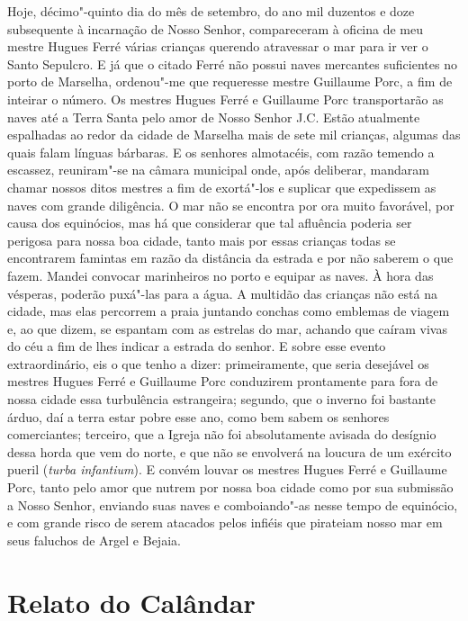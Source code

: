 Hoje, décimo"-quinto dia do mês de setembro, do ano mil duzentos e doze
subsequente à incarnação de Nosso Senhor, compareceram à oficina de meu
mestre Hugues Ferré várias crianças querendo atravessar o mar para ir ver
o Santo Sepulcro. E já que o citado Ferré não possui naves mercantes
suficientes no porto de Marselha, ordenou"-me que requeresse mestre
Guillaume Porc, a fim de inteirar o número. Os mestres Hugues Ferré e
Guillaume Porc transportarão as naves até a Terra Santa pelo amor de Nosso
Senhor J.C. Estão atualmente espalhadas ao redor da cidade de Marselha
mais de sete mil crianças, algumas das quais falam línguas bárbaras. E os
senhores almotacéis, com razão temendo a escassez, reuniram"-se na câmara
municipal onde, após deliberar, mandaram chamar nossos ditos mestres a fim
de exortá"-los e suplicar que expedissem as naves com grande diligência. O
mar não se encontra por ora muito favorável, por causa dos equinócios, mas
há que considerar que tal afluência poderia ser perigosa para nossa boa
cidade, tanto mais por essas crianças todas se encontrarem famintas em
razão da distância da estrada e por não saberem o que fazem. Mandei
convocar marinheiros no porto e equipar as naves. À hora das vésperas,
poderão puxá"-las para a água. A multidão das crianças não está na cidade,
mas elas percorrem a praia juntando conchas como emblemas de viagem e, ao
que dizem, se espantam com as estrelas do mar, achando que caíram vivas do
céu a fim de lhes indicar a estrada do senhor. E sobre esse evento
extraordinário, eis o que tenho a dizer: primeiramente, que seria
desejável os mestres Hugues Ferré e Guillaume Porc conduzirem prontamente
para fora de nossa cidade essa turbulência estrangeira; segundo, que o
inverno foi bastante árduo, daí a terra estar pobre esse ano, como bem
sabem os senhores comerciantes; terceiro, que a Igreja não foi
absolutamente avisada do desígnio dessa horda que vem do norte, e que não
se envolverá na loucura de um exército pueril (\textit{turba infantium}).
E convém louvar os mestres Hugues Ferré e Guillaume Porc, tanto pelo amor
que nutrem por nossa boa cidade como por sua submissão a Nosso Senhor,
enviando suas naves e comboiando"-as nesse tempo de equinócio, e com grande
risco de serem atacados pelos infiéis que pirateiam nosso mar em seus
faluchos de Argel e Bejaia.

\chapter{Relato do Calândar}

